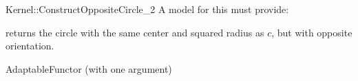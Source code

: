 \begin{ccRefFunctionObjectConcept}{Kernel::ConstructOppositeCircle_2}
A model for this must provide:


{ returns the circle with the same center and squared radius as
  $c$, but with opposite orientation.}

\ccRefines
AdaptableFunctor (with one argument)

\ccSeeAlso
{}\\

\end{ccRefFunctionObjectConcept}
